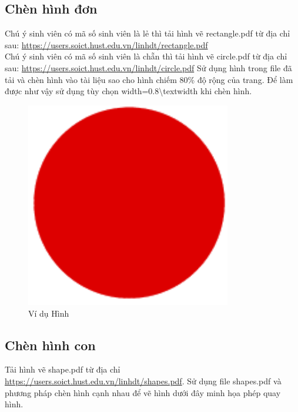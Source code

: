 \documentclass[a4paper,12pt]{article}
\begin{document}
\subsection*{Chèn hình đơn}
Chú ý sinh viên có mã số sinh viên là lẻ thì tải hình vẽ rectangle.pdf từ địa chỉ sau: \url{https://users.soict.hust.edu.vn/linhdt/rectangle.pdf}\\ 
Chú ý sinh viên có mã số sinh viên là chẵn thì tải hình vẽ circle.pdf từ địa chỉ sau: \url{https://users.soict.hust.edu.vn/linhdt/circle.pdf} Sử dụng hình trong file đã tải và chèn hình vào tài liệu sao cho hình chiếm 80\% độ rộng của trang. Để làm được như vậy sử dụng tùy chọn width=0.8\textbackslash textwidth khi chèn hình.
\begin{figure}[tbh]
    \centering
    \includegraphics[width=0.8\textwidth]{circle.pdf}
    \caption{Ví dụ Hình}
    \label{fig:Hinh1}
\end{figure}
\pagebreak
\subsection*{Chèn hình con}
Tải hình vẽ shape.pdf từ địa chỉ \url{https://users.soict.hust.edu.vn/linhdt/shapes.pdf}. Sử dụng file shapes.pdf và phương pháp chèn hình cạnh nhau để vẽ hình dưới đây minh họa phép quay hình.
\end{document}
